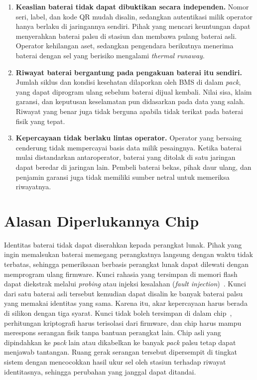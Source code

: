 \documentclass[11pt,a4paper]{article}
\begin{document}
\begin{enumerate}[label=\textbf{P\arabic*.}]
  \item \textbf{Keaslian baterai tidak dapat dibuktikan secara independen.} Nomor seri, label, dan kode QR mudah disalin, sedangkan autentikasi milik operator hanya berlaku di jaringannya sendiri. Pihak yang mencari keuntungan dapat menyerahkan baterai palsu di stasiun dan membawa pulang baterai asli. Operator kehilangan aset, sedangkan pengendara berikutnya menerima baterai dengan sel yang berisiko mengalami \emph{thermal runaway}.
  \item \textbf{Riwayat baterai bergantung pada pengakuan baterai itu sendiri.} Jumlah siklus dan kondisi kesehatan dilaporkan oleh BMS di dalam \emph{pack}, yang dapat diprogram ulang sebelum baterai dijual kembali. Nilai sisa, klaim garansi, dan keputusan keselamatan pun didasarkan pada data yang salah. Riwayat yang benar juga tidak berguna apabila tidak terikat pada baterai fisik yang tepat.
  \item \textbf{Kepercayaan tidak berlaku lintas operator.} Operator yang bersaing cenderung tidak mempercayai basis data milik pesaingnya. Ketika baterai mulai distandarkan antaroperator, baterai yang ditolak di satu jaringan dapat beredar di jaringan lain. Pembeli baterai bekas, pihak daur ulang, dan penjamin garansi juga tidak memiliki sumber netral untuk memeriksa riwayatnya.
\end{enumerate}

\section{Alasan Diperlukannya Chip}

Identitas baterai tidak dapat diserahkan kepada perangkat lunak. Pihak yang ingin memalsukan baterai memegang perangkatnya langsung dengan waktu tidak terbatas, sehingga pemeriksaan berbasis perangkat lunak dapat dilewati dengan memprogram ulang firmware. Kunci rahasia yang tersimpan di memori flash dapat diekstrak melalui \emph{probing} atau injeksi kesalahan (\emph{fault injection})~\cite{barel}. Kunci dari satu baterai asli tersebut kemudian dapat disalin ke banyak baterai palsu yang memakai identitas yang sama. Karena itu, akar kepercayaan harus berada di silikon dengan tiga syarat. Kunci tidak boleh tersimpan di dalam chip~\cite{suh,maes}, perhitungan kriptografi harus terisolasi dari firmware, dan chip harus mampu merespons serangan fisik tanpa bantuan perangkat lain. Chip asli yang dipindahkan ke \emph{pack} lain atau dikabelkan ke banyak \emph{pack} palsu tetap dapat menjawab tantangan. Ruang gerak serangan tersebut dipersempit di tingkat sistem dengan mencocokkan hasil ukur sel oleh stasiun terhadap riwayat identitasnya, sehingga perubahan yang janggal dapat ditandai.
\end{document}
